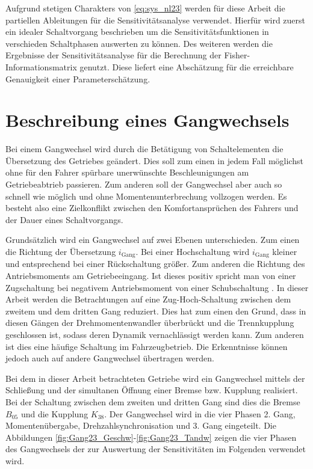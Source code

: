 Aufgrund stetigen Charakters von \eqref{eq:sys_nl23} werden für diese Arbeit die partiellen Ableitungen für die Sensitivitätsanalyse verwendet.
Hierfür wird zuerst ein idealer Schaltvorgang beschrieben um die Sensitivitätsfunktionen in verschieden Schaltphasen auswerten zu können. Des weiteren werden die Ergebnisse der Sensitivitätsanalyse für die Berechnung der Fisher-Informationsmatrix genutzt. Diese liefert eine Abschätzung für die erreichbare Genauigkeit einer Parameterschätzung.
   
\section{Beschreibung eines Gangwechsels}\label{sec:Gangwechsel}
Bei einem Gangwechsel wird durch die Betätigung von Schaltelementen die Übersetzung des Getriebes geändert. Dies soll zum einen in jedem Fall möglichst ohne für den Fahrer spürbare unerwünschte Beschleunigungen am Getriebeabtrieb passieren. Zum anderen soll der Gangwechsel aber auch so schnell wie möglich und ohne Momentenunterbrechung vollzogen werden. Es besteht also eine Zielkonflikt zwischen den Komfortansprüchen des Fahrers und der Dauer eines Schaltvorgangs. 

Grundsätzlich wird ein Gangwechsel auf zwei Ebenen unterschieden. Zum einen die Richtung der Übersetzung $i_\mathrm{Gang}$. Bei einer Hochschaltung wird $i_\mathrm{Gang}$ kleiner und entsprechend bei einer Rückschaltung größer. Zum anderen die Richtung des Antriebsmoments am Getriebeeingang. Ist dieses positiv spricht man von einer Zugschaltung bei negativem Antriebsmoment von einer Schubschaltung \cite{Fischer.2016}.
In dieser Arbeit werden die Betrachtungen auf eine Zug-Hoch-Schaltung zwischen dem zweitem und dem dritten Gang reduziert. Dies hat zum einen den Grund, dass in diesen Gängen der Drehmomentenwandler überbrückt und die Trennkupplung geschlossen ist, sodass deren Dynamik vernachlässigt werden kann. Zum anderen ist dies eine häufige Schaltung im Fahrzeugbetrieb. Die Erkenntnisse können jedoch auch auf andere Gangwechsel übertragen werden.

Bei dem in dieser Arbeit betrachteten Getriebe wird ein Gangwechsel mittels der Schließung und der simultanen Öffnung einer Bremse bzw. Kupplung realisiert. Bei der Schaltung zwischen dem zweiten und dritten Gang sind dies die Bremse $B_\mathrm{05}$ und die Kupplung $K_\mathrm{38}$. Der Gangwechsel wird in die vier Phasen 2. Gang, Momentenübergabe, Drehzahlsynchronisation und 3. Gang eingeteilt. Die Abbildungen \ref{fig:Gang23_Geschw}-\ref{fig:Gang23_Tandw} zeigen die vier Phasen des Gangwechsels der zur Auswertung der Sensitivitäten im Folgenden verwendet wird.

